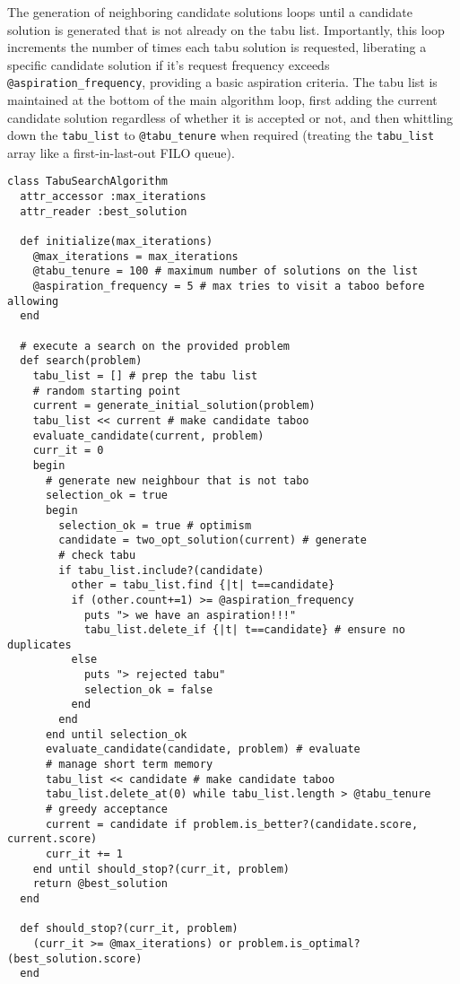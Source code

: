 The generation of neighboring candidate solutions loops until a candidate solution is generated that is not already on the tabu list. Importantly, this loop increments the number of times each tabu solution is requested, liberating a specific candidate solution if it's request frequency exceeds \texttt{@aspiration\_frequency}, providing a basic aspiration criteria. The tabu list is maintained at the bottom of the main algorithm loop, first adding the current candidate solution regardless of whether it is accepted or not, and then whittling down the \texttt{tabu\_list} to \texttt{@tabu\_tenure} when required (treating the \texttt{tabu\_list} array like a first-in-last-out FILO queue).

\begin{lstlisting}
class TabuSearchAlgorithm
  attr_accessor :max_iterations
  attr_reader :best_solution
  
  def initialize(max_iterations)
    @max_iterations = max_iterations
    @tabu_tenure = 100 # maximum number of solutions on the list
    @aspiration_frequency = 5 # max tries to visit a taboo before allowing
  end
  
  # execute a search on the provided problem
  def search(problem)
    tabu_list = [] # prep the tabu list
    # random starting point
    current = generate_initial_solution(problem)
    tabu_list << current # make candidate taboo
    evaluate_candidate(current, problem)
    curr_it = 0       
    begin
      # generate new neighbour that is not tabo
      selection_ok = true
      begin
        selection_ok = true # optimism
        candidate = two_opt_solution(current) # generate
        # check tabu
        if tabu_list.include?(candidate)
          other = tabu_list.find {|t| t==candidate}
          if (other.count+=1) >= @aspiration_frequency
            puts "> we have an aspiration!!!"
            tabu_list.delete_if {|t| t==candidate} # ensure no duplicates
          else
            puts "> rejected tabu"
            selection_ok = false 
          end
        end
      end until selection_ok
      evaluate_candidate(candidate, problem) # evaluate
      # manage short term memory
      tabu_list << candidate # make candidate taboo
      tabu_list.delete_at(0) while tabu_list.length > @tabu_tenure
      # greedy acceptance
      current = candidate if problem.is_better?(candidate.score, current.score)
      curr_it += 1
    end until should_stop?(curr_it, problem)
    return @best_solution
  end
  
  def should_stop?(curr_it, problem)
    (curr_it >= @max_iterations) or problem.is_optimal?(best_solution.score)
  end
  

\end{lstlisting}
